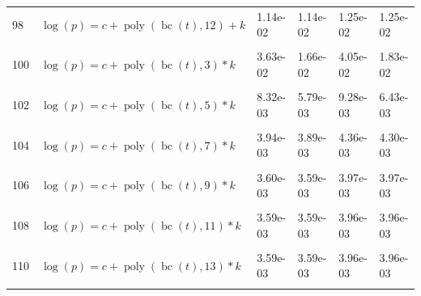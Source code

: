 \documentclass[12pt,a4paper]{article}
\DeclareMathOperator{\bc}{bc}
\DeclareMathOperator{\poly}{poly}
\begin{document}
\begin{longtable}[t]{ll>{\raggedleft\arraybackslash}p{2cm}>{\raggedleft\arraybackslash}p{2cm}>{\raggedleft\arraybackslash}p{2cm}>{\raggedleft\arraybackslash}p{2cm}}
98 & $\log(p) = c + \poly\left( \bc(t), 12 \right) + k$ & 1.14e-02 & 1.14e-02 & 1.25e-02 & 1.25e-02\\
\cellcolor{gray!6}{99} & \cellcolor{gray!6}{$\log(p) = c + \poly\left( \bc(t), 13 \right) + k$} & \cellcolor{gray!6}{1.14e-02} & \cellcolor{gray!6}{1.14e-02} & \cellcolor{gray!6}{1.25e-02} & \cellcolor{gray!6}{1.25e-02}\\
100 & $\log(p) = c + \poly\left( \bc(t), 3 \right) * k$ & 3.63e-02 & 1.66e-02 & 4.05e-02 & 1.83e-02\\
\cellcolor{gray!6}{101} & \cellcolor{gray!6}{$\log(p) = c + \poly\left( \bc(t), 4 \right) * k$} & \cellcolor{gray!6}{1.89e-02} & \cellcolor{gray!6}{1.88e-02} & \cellcolor{gray!6}{2.10e-02} & \cellcolor{gray!6}{2.10e-02}\\
102 & $\log(p) = c + \poly\left( \bc(t), 5 \right) * k$ & 8.32e-03 & 5.79e-03 & 9.28e-03 & 6.43e-03\\
\cellcolor{gray!6}{103} & \cellcolor{gray!6}{$\log(p) = c + \poly\left( \bc(t), 6 \right) * k$} & \cellcolor{gray!6}{3.65e-03} & \cellcolor{gray!6}{3.63e-03} & \cellcolor{gray!6}{4.03e-03} & \cellcolor{gray!6}{4.01e-03}\\
104 & $\log(p) = c + \poly\left( \bc(t), 7 \right) * k$ & 3.94e-03 & 3.89e-03 & 4.36e-03 & 4.30e-03\\
\cellcolor{gray!6}{105} & \cellcolor{gray!6}{$\log(p) = c + \poly\left( \bc(t), 8 \right) * k$} & \cellcolor{gray!6}{3.70e-03} & \cellcolor{gray!6}{3.65e-03} & \cellcolor{gray!6}{4.09e-03} & \cellcolor{gray!6}{4.03e-03}\\
106 & $\log(p) = c + \poly\left( \bc(t), 9 \right) * k$ & 3.60e-03 & 3.59e-03 & 3.97e-03 & 3.97e-03\\
\cellcolor{gray!6}{107} & \cellcolor{gray!6}{$\log(p) = c + \poly\left( \bc(t), 10 \right) * k$} & \cellcolor{gray!6}{3.59e-03} & \cellcolor{gray!6}{3.59e-03} & \cellcolor{gray!6}{3.96e-03} & \cellcolor{gray!6}{3.96e-03}\\
108 & $\log(p) = c + \poly\left( \bc(t), 11 \right) * k$ & 3.59e-03 & 3.59e-03 & 3.96e-03 & 3.96e-03\\
\cellcolor{gray!6}{109} & \cellcolor{gray!6}{$\log(p) = c + \poly\left( \bc(t), 12 \right) * k$} & \cellcolor{gray!6}{3.59e-03} & \cellcolor{gray!6}{3.59e-03} & \cellcolor{gray!6}{3.96e-03} & \cellcolor{gray!6}{3.96e-03}\\
110 & $\log(p) = c + \poly\left( \bc(t), 13 \right) * k$ & 3.59e-03 & 3.59e-03 & 3.96e-03 & 3.96e-03\\
\cellcolor{gray!6}{111} & \cellcolor{gray!6}{$\log(p) = c + \poly\left( \bc(t), 3 \right) + \log(k)$} & \cellcolor{gray!6}{3.67e-02} & \cellcolor{gray!6}{1.98e-02} & \cellcolor{gray!6}{4.09e-02} & \cellcolor{gray!6}{2.19e-02}\\

\end{longtable}
\end{document}
